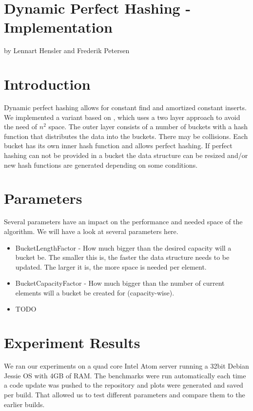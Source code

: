 \documentclass{article}
\begin{document}
\section*{Dynamic Perfect Hashing - Implementation}

by Lennart Hensler and Frederik Petersen

\section{Introduction}

Dynamic perfect hashing allows for constant find and amortized constant inserts.
We implemented a variant based on \cite{di94}, which uses a two layer approach
to avoid the need of $ n^2 $ space. The outer layer consists of a number of
buckets with a hash function that distributes the data into the buckets. There
may be collisions. Each bucket has its own inner hash function and allows
perfect hashing. If perfect hashing can not be provided in a bucket the data
structure can be resized and/or new hash functions are generated depending on
some conditions.

\section{Parameters}

Several parameters have an impact on the performance and needed space of the
algorithm. We will have a look at several parameters here.

\begin{itemize}
  \item BucketLengthFactor - How much bigger than the desired capacity will a
  bucket be. The smaller this is, the faster the data structure needs to be
  updated. The larger it is, the more space is needed per element.
  \item BucketCapacityFactor - How much bigger than the number of current
  elements will a bucket be created for (capacity-wise).
  \item TODO
\end{itemize}

\section{Experiment Results}

We ran our experiments on a quad core Intel Atom server running a 32bit Debian
Jessie OS with 4GB of RAM. The benchmarks were run automatically each time a
code update was pushed to the repository and plots were generated and saved per
build. That allowed us to test different parameters and compare them to the
earlier builds.
\end{document}
